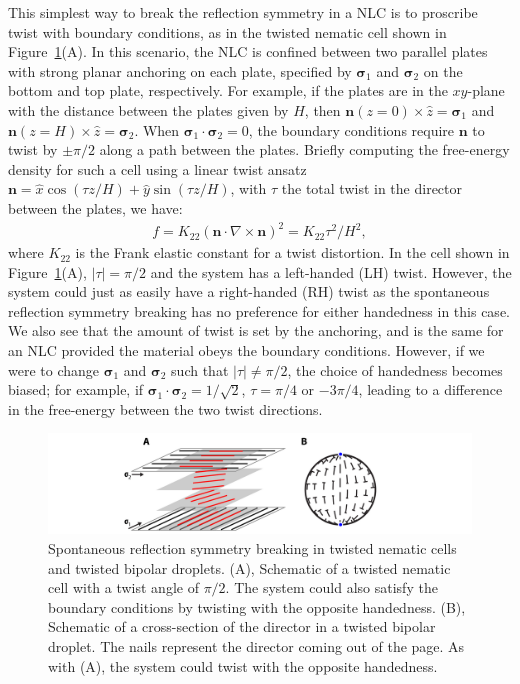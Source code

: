 This simplest way to break the reflection symmetry in a NLC is to proscribe twist with boundary conditions, as in the twisted nematic cell shown in Figure~\ref{f:4-SSB}(A).
In this scenario, the NLC is confined between two parallel plates with strong planar anchoring on each plate, specified by $\bm{\sigma}_1$ and $\bm{\sigma}_2$ on the bottom and top plate, respectively.
For example, if the plates are in the $xy$-plane with the distance between the plates given by $H$, then $\mathbf{n}(z = 0) \times \hat{z} = \bm{\sigma}_1$ and $\mathbf{n}(z = H) \times \hat{z} = \bm{\sigma}_2$.
When $\bm{\sigma}_1 \cdot \bm{\sigma}_2 = 0$, the boundary conditions require $\mathbf{n}$ to twist by $\pm \pi/2$ along a path between the plates.
Briefly computing the free-energy density for such a cell using a linear twist ansatz $\mathbf{n} = \hat{x} \cos (\tau z/H) + \hat{y} \sin(\tau z/H)$, with $\tau$ the total twist in the director between the plates, we have:
\begin{align}
  f = K_{22}(\mathbf{n} \cdot \nabla \times \mathbf{n})^2 = K_{22}\tau^2/H^2,
\end{align}
where $K_{22}$ is the Frank elastic constant for a twist distortion.
In the cell shown in Figure~\ref{f:4-SSB}(A), $|\tau| = \pi/2$ and the system has a left-handed (LH) twist.
However, the system could just as easily have a right-handed (RH) twist as the spontaneous reflection symmetry breaking has no preference for either handedness in this case.
We also see that the amount of twist is set by the anchoring, and is the same for an NLC provided the material obeys the boundary conditions.
However, if we were to change $\bm{\sigma}_1$ and $\bm{\sigma}_2$ such that $|\tau| \neq \pi/2$, the choice of handedness becomes biased; for example, if $\bm{\sigma}_1 \cdot \bm{\sigma}_2 = 1/\sqrt{2}$, $\tau = \pi/4$ or $-3\pi/4$, leading to a difference in the free-energy between the two twist directions.
\begin{figure}
  \centering
  \includegraphics{figures/C4/Ch4-Figs_SSB.png}
  \caption{Spontaneous reflection symmetry breaking in twisted nematic cells and twisted bipolar droplets.
  (A), Schematic of a twisted nematic cell with a twist angle of $\pi/2$.
  The system could also satisfy the boundary conditions by twisting with the opposite handedness.
  (B), Schematic of a cross-section of the director in a twisted bipolar droplet.
  The nails represent the director coming out of the page.
  As with (A), the system could twist with the opposite handedness.}\label{f:4-SSB}
\end{figure}

